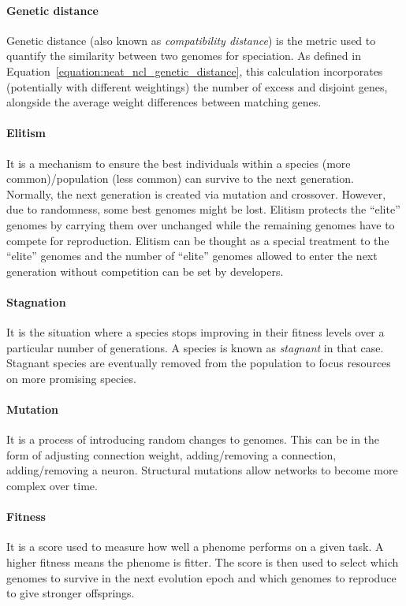 \documentclass{article}
\begin{document}
\paragraph{Genetic distance}
Genetic distance (also known as \textit{compatibility distance}) is the metric used to quantify the similarity between two genomes for speciation. As defined in Equation~\ref{equation:neat_ncl_genetic_distance}, this calculation incorporates (potentially with different weightings) the number of excess and disjoint genes, alongside the average weight differences between matching genes. 

\paragraph{Elitism}
It is a mechanism to ensure the best individuals within a species (more common)/population (less common) can survive to the next generation. Normally, the next generation is created via mutation and crossover. However, due to randomness, some best genomes might be lost. Elitism protects the ``elite'' genomes by carrying them over unchanged while the remaining genomes have to compete for reproduction. Elitism can be thought as a special treatment to the ``elite'' genomes and the number of ``elite'' genomes allowed to enter the next generation without competition can be set by developers. 

\paragraph{Stagnation}
It is the situation where a species stops improving in their fitness levels over a particular number of generations. A species is known as \textit{stagnant} in that case. Stagnant species are eventually removed from the population to focus resources on more promising species. 

\paragraph{Mutation}
It is a process of introducing random changes to genomes. This can be in the form of adjusting connection weight, adding/removing a connection, adding/removing a neuron. Structural mutations allow networks to become more complex over time. 

\paragraph{Fitness}
It is a score used to measure how well a phenome performs on a given task. A higher fitness means the phenome is fitter. The score is then used to select which genomes to survive in the next evolution epoch and which genomes to reproduce to give stronger offsprings. 
\end{document}
